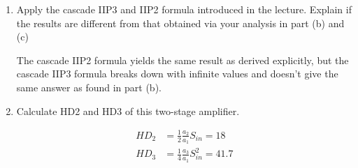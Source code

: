 \begin{enumerate}[label=(\alph*)]
    \item {\color{blue} Apply the cascade IIP3 and IIP2 formula introduced in the lecture. Explain if the results are different from that obtained via your analysis in part (b) and (c)}

    The cascade IIP2 formula yields the same result as derived explicitly, but the cascade IIP3 formula breaks down with infinite values and doesn't give the same answer as found in part (b).

    \item {\color{blue} Calculate HD2 and HD3 of this two-stage amplifier.}

    \begin{align*}
        HD_2 &= \frac{1}{2} \frac{a_2}{a_1} S_{in} = 18 \\
        HD_3 &= \frac{1}{4} \frac{a_3}{a_1} S_{in}^2 = 41.7
    \end{align*}

\end{enumerate}


